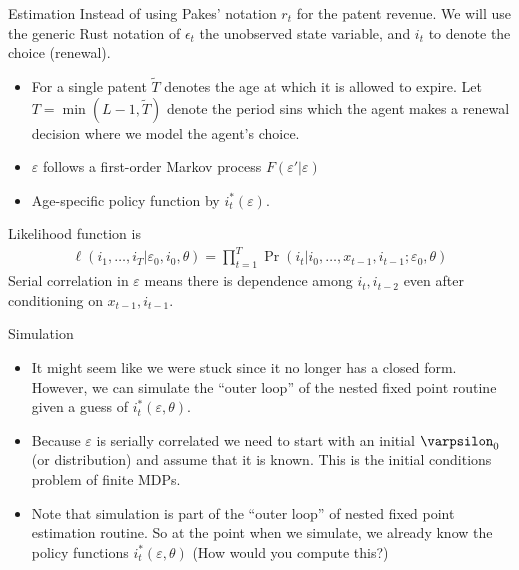 \begin{frame}{Estimation}
Instead of using Pakes' notation $r_t$ for the patent revenue. We will use the generic Rust notation of $\epsilon_t$ the unobserved state variable, and $i_t$ to denote the choice (renewal).
\begin{itemize}
\item For a single patent $\tilde{T}$ denotes the age at which it is allowed to expire. Let $T = \min(L-1,\tilde{T})$ denote the period sins which the agent makes a renewal decision where we model the agent's choice.
\item $\varepsilon$ follows a first-order Markov process $F(\varepsilon' | \varepsilon)$
\item Age-specific policy function by $i^*_t(\varepsilon)$.
\end{itemize}
Likelihood function is 
\begin{align*}
\ell(i_1,\ldots,i_T | \varepsilon_0,i_0,\theta) = \prod_{t=1}^T \Pr(i_t | i_0, \ldots,  x_{t-1}, i_{t-1} ; \varepsilon_0, \theta)
\end{align*}
Serial correlation in $\varepsilon$ means there is dependence among $i_{t}, i_{t-2}$ even after conditioning on $x_{t-1},i_{t-1}$. 
\end{frame}

\begin{frame}{Simulation}
\begin{itemize}
\item It might seem like we were stuck since it no longer has a closed form.  However, we can simulate the ``outer loop'' of the nested fixed point routine given a guess  of $i^*_t(\varepsilon,\theta)$.
\item Because $\varepsilon$ is serially correlated we need to start with an initial $\varpsilon_0$ (or distribution) and assume that it is known.  This is the \alert{initial conditions problem} of finite MDPs.
\item Note that simulation is part of the ``outer loop'' of nested fixed point estimation routine. So at the point when we simulate, we already know the policy functions $i_t^{*}(\varepsilon,\theta)$ (How would you compute this?)
\end{itemize}
\end{frame}

